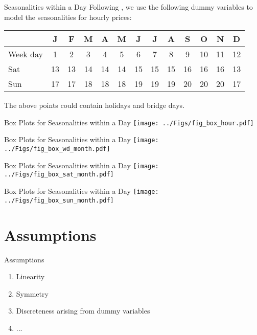 \documentclass{beamer}
\begin{document}
\begin{frame}{Seasonalities within a Day}
    Following \cite{SteinErikParaschivSchuerle-2013}, we use the following dummy variables to model the seasonalities for hourly prices:

    \footnotesize
    \begin{tabular}{l|cccccccccccc}
         & J  & F  & M  & A  & M  & J  & J  & A  & S  & O  & N  & D
        \\
        \toprule
        Week day
         & 1  & 2  & 3  & 4  & 5  & 6  & 7  & 8  & 9  & 10 & 11 & 12
        \\
        Sat
         & 13 & 13 & 14 & 14 & 14 & 15 & 15 & 15 & 16 & 16 & 16 & 13
        \\
        Sun
         & 17 & 17 & 18 & 18 & 18 & 19 & 19 & 19 & 20 & 20 & 20 & 17
    \end{tabular}

    \vspace*{0.8cm}
    The above points could contain holidays and bridge days.
\end{frame}


\begin{frame}{Box Plots for Seasonalities within a Day}
    \texttt{[image: ../Figs/fig\_box\_hour.pdf]}
\end{frame}


\begin{frame}{Box Plots for Seasonalities within a Day}
    \texttt{[image: ../Figs/fig\_box\_wd\_month.pdf]}
\end{frame}


\begin{frame}{Box Plots for Seasonalities within a Day}
    \texttt{[image: ../Figs/fig\_box\_sat\_month.pdf]}
\end{frame}


\begin{frame}{Box Plots for Seasonalities within a Day}
    \texttt{[image: ../Figs/fig\_box\_sun\_month.pdf]}
\end{frame}


\section{Assumptions}

\begin{frame}{Assumptions}
    \begin{enumerate}[label=\roman*.]
        \item Linearity
        \item Symmetry
        \item Discreteness arising from dummy variables
        \item ...
    \end{enumerate}
\end{frame}
\end{document}
